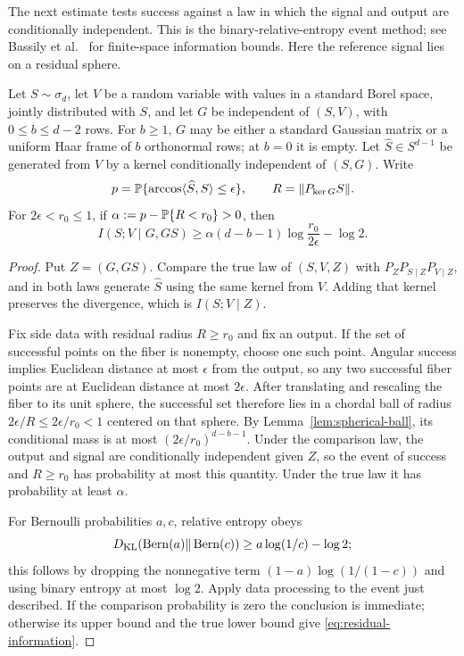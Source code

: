 The next estimate tests success against a law in which the signal and
output are conditionally independent. This is the binary-relative-entropy
event method; see Bassily et al.~\cite[Appendix~A.1, Lemmas~14--15]{BassilyEtAl2018}
for finite-space information bounds. Here the reference signal lies on
a residual sphere.

\begin{lemma}\label{lem:residual-information}
Let $S\sim\sigma_d$, let $V$ be a random variable with values in a standard
Borel space, jointly distributed with $S$, and let $G$ be independent of
$(S,V)$, with $0\le b\le d-2$ rows. For $b\ge1$, $G$ may be either a standard
Gaussian matrix or a uniform Haar frame of $b$ orthonormal rows; at $b=0$
it is empty. Let $\widehat S\in S^{d-1}$
be generated from $V$ by a kernel conditionally independent of $(S,G)$.
Write
\[
 p=\mathbb P\{\arccos\langle\widehat S,S\rangle\le\epsilon\},
 \qquad R=\lVert P_{\ker G}S\rVert.
\]
For $2\epsilon<r_0\le1$, if $\alpha:=p-\mathbb P\{R<r_0\}>0$, then
\begin{equation}\label{eq:residual-information}
 I(S;V\mid G,GS)\ge
 \alpha(d-b-1)\log\frac{r_0}{2\epsilon}-\log2.
\end{equation}
\end{lemma}

\begin{proof}
Put $Z=(G,GS)$. Compare the true law of $(S,V,Z)$ with
$P_ZP_{S\mid Z}P_{V\mid Z}$, and in both laws generate $\widehat S$ using
the same kernel from $V$. Adding that kernel preserves the divergence,
which is $I(S;V\mid Z)$.

Fix side data with residual radius $R\ge r_0$ and fix an output. If the
set of successful points on the fiber is nonempty, choose one such point.
Angular success implies Euclidean distance at most $\epsilon$ from the
output, so any two successful fiber points are at Euclidean distance at
most $2\epsilon$. After translating and rescaling the fiber to its unit
sphere, the successful set therefore lies in a chordal ball of radius
$2\epsilon/R\le2\epsilon/r_0<1$ centered on that sphere. By
Lemma~\ref{lem:spherical-ball}, its conditional mass is at most
$(2\epsilon/r_0)^{d-b-1}$. Under the comparison law, the output and signal
are conditionally independent given $Z$, so the event of success and
$R\ge r_0$ has probability at most this quantity. Under the true law it has
probability at least $\alpha$.

For Bernoulli probabilities $a,c$, relative entropy obeys
\[
 D_{\mathrm{KL}}(\operatorname{Bern}(a)\Vert\operatorname{Bern}(c))
 \ge a\log(1/c)-\log2;
\]
this follows by dropping the nonnegative term
$(1-a)\log(1/(1-c))$ and using binary entropy at most $\log2$.
Apply data processing to the event just described. If the comparison
probability is zero the conclusion is immediate; otherwise its upper bound
and the true lower bound give \eqref{eq:residual-information}.
\end{proof}

